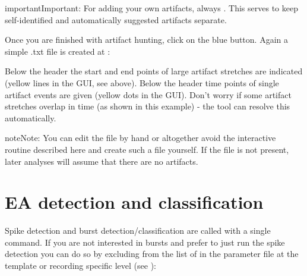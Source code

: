 \documentclass[letterpaper,10pt,english]{sphinxmanual}
\let\sphinxpxdimen\pdfpxdimen\else\newdimen\sphinxpxdimen
\begin{document}
\noindent{\hspace*{\fill}\sphinxincludegraphics[width=700\sphinxpxdimen]{{arts_added}.png}\hspace*{\fill}}

\begin{sphinxadmonition}{important}{Important:}
For adding your own artifacts, always . This serves to keep self-identified and automatically suggested artifacts separate.
\end{sphinxadmonition}

Once you are finished with artifact hunting, click on the blue  button. Again a simple .txt file is created at
:

\noindent{\hspace*{\fill}\sphinxincludegraphics[width=300\sphinxpxdimen]{{arts_file}.png}\hspace*{\fill}}

Below the header  the start and end points of large artifact stretches are indicated (yellow lines in the GUI, see above). Below the header
 time points of single artifact events are given (yellow dots in the GUI). Don’t worry if some artifact stretches overlap in time (as shown in this example)
- the tool can resolve this automatically.

\label{\detokenize{preprocessing:adding-artifacts-manually}}
\begin{sphinxadmonition}{note}{Note:}
You can edit the file  by hand or altogether avoid the interactive routine described here and create such a file yourself.
If the file  is not present, later analyses will assume that there are no artifacts.
\end{sphinxadmonition}


\chapter{EA detection and classification}
\label{\detokenize{LFP_to_bursts:ea-detection-and-classification}}\label{\detokenize{LFP_to_bursts:lfp-to-bursts}}\label{\detokenize{LFP_to_bursts::doc}}
Spike detection and burst detection/classification are called with a single command. If you are not interested in bursts and
prefer to just run the spike detection you can do so by excluding  from the list of  in
the parameter file at the template or recording specific level (see {\hyperref[\detokenize{setting_parameters:setting-parameters}]{}}):
\end{document}
